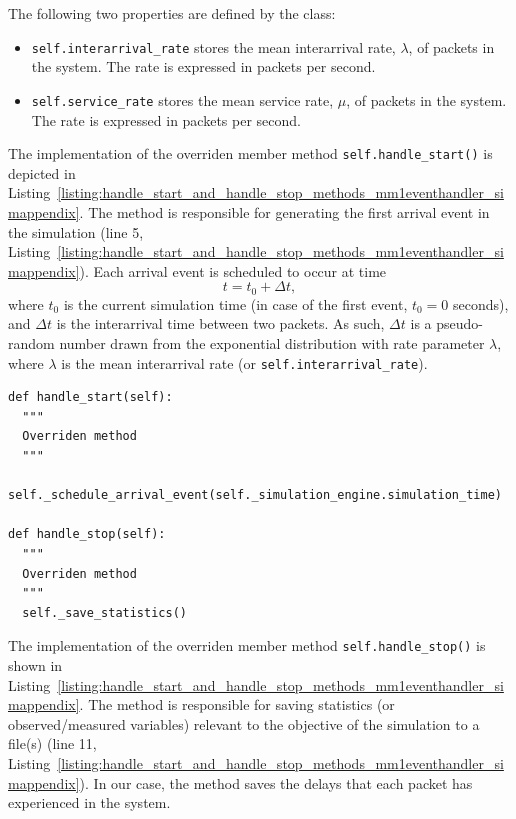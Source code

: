 The following two properties are defined by the class:
\begin{itemize}
  \item \lstinline{self.interarrival_rate} stores the mean interarrival rate, $\lambda$, of packets in the system. The rate is expressed in packets per second.
  \item \lstinline{self.service_rate} stores the mean service rate, $\mu$, of packets in the system. The rate is expressed in packets per second.
\end{itemize}

The implementation of the overriden member method \lstinline{self.handle_start()} is depicted in Listing~\ref{listing:handle_start_and_handle_stop_methods_mm1eventhandler_simappendix}. The method is responsible for generating the first arrival event in the simulation (line 5, Listing~\ref{listing:handle_start_and_handle_stop_methods_mm1eventhandler_simappendix}). Each arrival event is scheduled to occur at time
\begin{equation*}
  t = t_0 + \Delta t,
\end{equation*}
where $t_0$ is the current simulation time (in case of the first event, $t_0=0$ seconds), and $\Delta t$ is the interarrival time between two packets. As such, $\Delta t$ is a pseudo-random number drawn from the exponential distribution with rate parameter $\lambda$, where $\lambda$ is the mean interarrival rate (or \lstinline{self.interarrival_rate}).

\begin{lstlisting}[caption=\lstinline{self.handle_start()} and \lstinline{self.handle_stop()} member methods of the \lstinline{MM1EventHandler} class, label=listing:handle_start_and_handle_stop_methods_mm1eventhandler_simappendix]
def handle_start(self):
  """
  Overriden method
  """
  self._schedule_arrival_event(self._simulation_engine.simulation_time)

def handle_stop(self):
  """
  Overriden method
  """
  self._save_statistics()
\end{lstlisting}

The implementation of the overriden member method \lstinline{self.handle_stop()} is shown in Listing~\ref{listing:handle_start_and_handle_stop_methods_mm1eventhandler_simappendix}. The method is responsible for saving statistics (or observed/measured variables) relevant to the objective of the simulation to a file(s) (line 11, Listing~\ref{listing:handle_start_and_handle_stop_methods_mm1eventhandler_simappendix}). In our case, the method saves the delays that each packet has experienced in the system.

